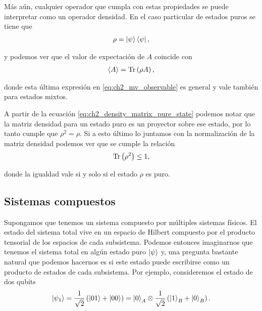 \documentclass[../main.tex]{subfiles}
\begin{document}
%	
%	

Más aún, cualquier operador que cumpla con estas propiedades se puede interpretar como un operador densidad. En el caso particular de estados puros se tiene que
\begin{align}
	\rho = \left | \psi \right \rangle \left \langle \psi \right |,
	\label{eq:ch2_density_matrix_pure_state}
\end{align}

\noindent y podemos ver que el valor de expectación de $A$ coincide con
\begin{align}
	\langle A \rangle = \text{Tr}\left ( \rho A \right ),
	\label{eq:ch2_mv_observable}
\end{align}

\noindent donde esta última expresión en \eqref{eq:ch2_mv_observable} es general y vale también para estados mixtos.

A partir de la ecuación \eqref{eq:ch2_density_matrix_pure_state} podemos notar que la matriz densidad para un estado puro es un proyector sobre ese estado, por lo tanto cumple que $\rho^2 = \rho$. Si a esto último lo juntamos con la normalización de la matriz densidad podemos ver que se cumple la relación
\begin{align}
	\text{Tr}\left ( \rho^2 \right ) \leq 1,
\end{align}

\noindent donde la igualdad vale si y solo si el estado $\rho$ es puro.


\subsection{Sistemas compuestos}

Supongamos que tenemos un sistema compuesto por múltiples sistemas físicos. El estado del sistema total vive en un espacio de Hilbert compuesto por el producto tensorial de los espacios de cada subsistema. Podemos entonces imaginarnos que tenemos el sistema total en algún estado puro $\left | \psi \right \rangle$ y, una pregunta bastante natural que podemos hacernos es si este estado puede escribirse como un producto de estados de cada subsistema. Por ejemplo, consideremos el estado de dos qubits
\begin{align}
	\left | \psi_1 \right \rangle = \frac 1{\sqrt 2} \left ( \left | 0 1 \right \rangle + \left | 0 0 \right \rangle \right ) = \left | 0 \right \rangle_A \otimes \frac 1{\sqrt 2} \left ( \left | 1 \right \rangle_B + \left | 0 \right \rangle_B \right ).
\end{align}
\end{document}
